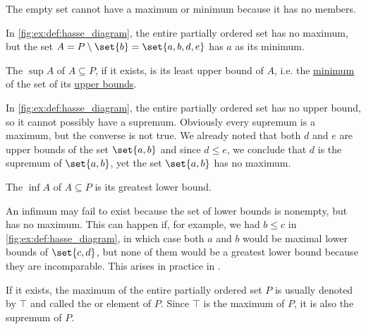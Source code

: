 \begin{definition}
\begin{thmenum}
\begin{minipage}[t]{0.45\textwidth}
      The empty set cannot have a maximum or minimum because it has no members.

      In \cref{fig:ex:def:hasse_diagram}, the entire partially ordered set has no maximum, but the set \( A = P \setminus \set{ b } = \set{ a, b, d, e } \) has \( a \) as its minimum.
    \end{minipage}

    \begin{minipage}[t]{0.45\textwidth}
      The  \( \sup A \) of \( A \subseteq P \), if it exists, is its least upper bound of \( A \), i.e. the \hyperref[def:partially_ordered_set_extremal_points/maximum_and_minimum]{minimum} of the set of its \hyperref[def:partially_ordered_set_extremal_points/upper_and_lower_bounds]{upper bounds}.

      In \cref{fig:ex:def:hasse_diagram}, the entire partially ordered set has no upper bound, so it cannot possibly have a supremum. Obviously every supremum is a maximum, but the converse is not true. We already noted that both \( d \) and \( e \) are upper bounds of the set \( \set{ a, b } \) and since \( d \leq e \), we conclude that \( d \) is the supremum of \( \set{ a, b } \), yet the set \( \set{ a, b } \) has no maximum.
    \end{minipage}
    \hspace{0.02\textwidth}
    \begin{minipage}[t]{0.45\textwidth}
      The  \( \inf A \) of \( A \subseteq P \) is its greatest lower bound.

      An infimum may fail to exist because the set of lower bounds is nonempty, but has no maximum. This can happen if, for example, we had \( b \leq c \) in \cref{fig:ex:def:hasse_diagram}, in which case both \( a \) and \( b \) would be maximal lower bounds of \( \set{ c, d } \), but none of them would be a greatest lower bound because they are incomparable. This arises in practice in .
    \end{minipage}

    \begin{minipage}[t]{0.45\textwidth}
      If it exists, the maximum of the entire partially ordered set \( P \) is usually denoted by \( \top \) and called the  or  element of \( P \). Since \( \top \) is the maximum of \( P \), it is also the supremum of \( P \).


\end{minipage}
\end{thmenum}
\end{definition}
